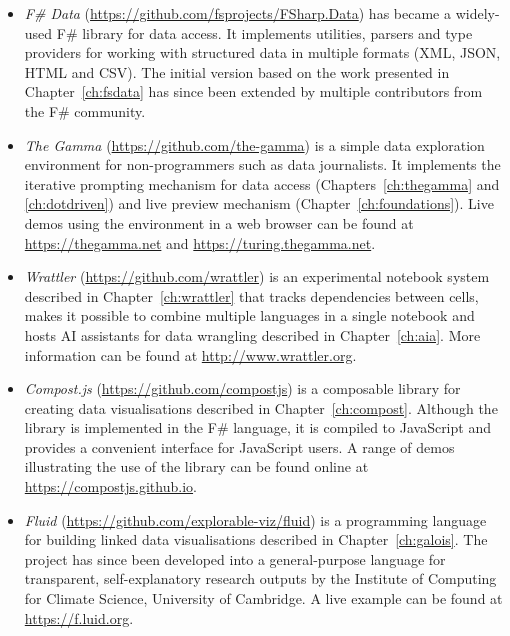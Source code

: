 \documentclass[fleqn,11pt]{report}
\theoremstyle{definition}
\newenvironment{nitemize}
{ \vspace{-0.4em}
  \begin{itemize}
    \setlength{\itemsep}{5pt}
    \setlength{\parskip}{0pt}
    \setlength{\parsep}{0pt} }
{ \end{itemize}
  \vspace{-0.4em} }
\begin{document}
\begin{nitemize}
  \item \emph{F\# Data} (\url{https://github.com/fsprojects/FSharp.Data}) has became a widely-used
    F\# library for data access. It implements utilities, parsers and type providers for working
    with structured data in multiple formats (XML, JSON, HTML and CSV). The initial version based
    on the work presented in Chapter~\ref{ch:fsdata} has since been extended by multiple
    contributors from the F\# community.

  \item \emph{The Gamma} (\url{https://github.com/the-gamma}) is a simple data exploration
    environment for non-programmers such as data journalists. It implements the iterative
    prompting mechanism for data access (Chapters~\ref{ch:thegamma} and \ref{ch:dotdriven})
    and live preview mechanism (Chapter~\ref{ch:foundations}). Live demos using the environment
    in a web browser can  be found at \url{https://thegamma.net} and \url{https://turing.thegamma.net}.

  \item \emph{Wrattler} (\url{https://github.com/wrattler}) is an experimental notebook system
    described in Chapter~\ref{ch:wrattler} that tracks dependencies between cells, makes it
    possible to combine multiple languages in a single notebook and hosts AI assistants for
    data wrangling described in Chapter~\ref{ch:aia}. More information can be found at
    \url{http://www.wrattler.org}.

  \item \emph{Compost.js} (\url{https://github.com/compostjs}) is a composable library for creating
    data visualisations described in Chapter~\ref{ch:compost}. Although the library is implemented
    in the F\# language, it is compiled to JavaScript and provides a convenient interface for
    Java\-Script users. A range of demos illustrating the use of the library can be found online at
    \url{https://compostjs.github.io}.

  \item \emph{Fluid} (\url{https://github.com/explorable-viz/fluid}) is a programming language
    for building linked data visualisations described in Chapter~\ref{ch:galois}. The project has
    since been developed into a general-purpose language for transparent, self-explanatory research
    outputs by the Institute of Computing for Climate Science, University of Cambridge.
    A live example can be found at \url{https://f.luid.org}.
\end{nitemize}
\end{document}
